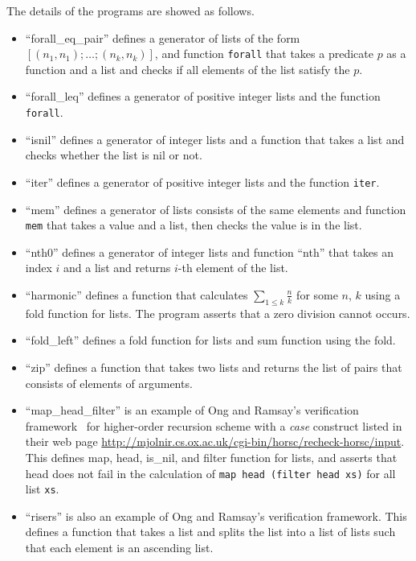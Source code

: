 The details of the programs are showed as follows.
\begin{itemize}
\item ``forall\_eq\_pair'' defines a generator of lists of the form
      $[(n_1,n_1);\dots;(n_k,n_k)]$, and function \texttt{forall} that
      takes a predicate $p$ as a function and a list and checks if all
      elements of the list satisfy the $p$.
\item ``forall\_leq'' defines a generator of positive integer lists and
      the function \texttt{forall}.
\item ``isnil'' defines a generator of integer lists and a function that
      takes a list and checks whether the list is nil or not.
\item ``iter'' defines a generator of positive integer lists and the
      function \texttt{iter}.
\item ``mem'' defines a generator of lists consists of the same elements
      and function \texttt{mem} that takes a value and a list, then
      checks the value is in the list.
\item ``nth0'' defines a generator of integer lists and function
      ``nth'' that takes an index $i$ and a list and returns $i$-th element of the list.
\item ``harmonic'' defines a function that calculates $\sum_{1 \leq k}
      \frac{n}{k}$ for some $n$, $k$ using a fold function for lists.
      The program asserts that a zero division cannot occurs.
\item ``fold\_left'' defines a fold function for lists and sum function
      using the fold.
\item ``zip'' defines a function that takes two lists and returns the
      list of pairs that consists of elements of arguments.
\item ``map\_head\_filter'' is an example of Ong and Ramsay's verification
      framework~\cite{Ong2011} for higher-order recursion scheme with a
      \textit{case} construct listed in their web page
      \url{http://mjolnir.cs.ox.ac.uk/cgi-bin/horsc/recheck-horsc/input}.
      This defines map, head, is\_nil, and filter function for lists, and
      asserts that head does not fail in the calculation of \texttt{map
      head (filter head xs)} for all list \texttt{xs}.
\item ``risers'' is also an example of Ong and Ramsay's verification
      framework.  This defines a function that takes a list and splits
      the list into a list of lists such that each element is an
      ascending list.
\end{itemize}

